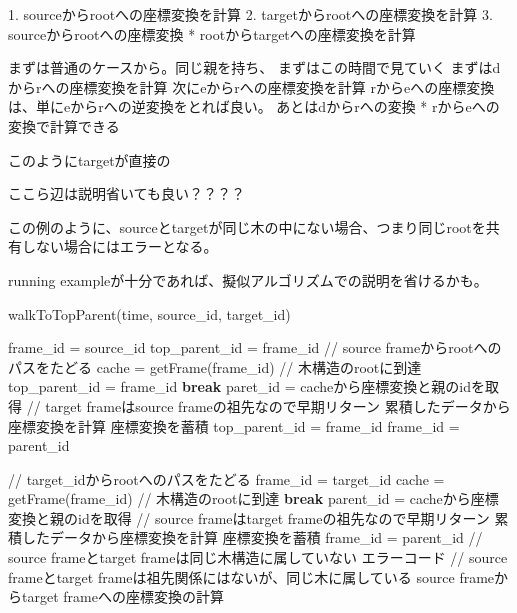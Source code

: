 \documentclass[a4paper]{jreport}	%
\begin{document}
1. sourceからrootへの座標変換を計算
2. targetからrootへの座標変換を計算
3. sourceからrootへの座標変換 * rootからtargetへの座標変換を計算

まずは普通のケースから。同じ親を持ち、
%
まずはこの時間で見ていく
まずはdからrへの座標変換を計算
次にeからrへの座標変換を計算
rからeへの座標変換は、単にeからrへの逆変換をとれば良い。
あとはdからrへの変換 * rからeへの変換で計算できる


このようにtargetが直接の

ここら辺は説明省いても良い？？？？

この例のように、sourceとtargetが同じ木の中にない場合、つまり同じrootを共有しない場合にはエラーとなる。


running exampleが十分であれば、擬似アルゴリズムでの説明を省けるかも。

\begin{algorithm}[H]
	\caption{walkToTopParent(time, source\_id, target\_id)}
	\begin{algorithmic}
	\STATE frame\_id = source\_id
	\STATE top\_parent\_id = frame\_id
	\STATE // source frameからrootへのパスをたどる
	\STATE cache = getFrame(frame\_id)
	\STATE // 木構造のrootに到達
	\STATE top\_parent\_id = frame\_id
	\STATE \textbf{break}
	\ENDIF
	\STATE paret\_id = cacheから座標変換と親のidを取得
	\STATE // target frameはsource frameの祖先なので早期リターン
	\STATE 累積したデータから座標変換を計算
	\ENDIF
	\STATE 座標変換を蓄積
	\STATE top\_parent\_id = frame\_id
	\STATE frame\_id = parent\_id
	\ENDWHILE
	
	\STATE // target\_idからrootへのパスをたどる
	\STATE frame\_id = target\_id
	\STATE cache = getFrame(frame\_id)
	\STATE // 木構造のrootに到達
	\STATE \textbf{break}
	\ENDIF
	\STATE parent\_id = cacheから座標変換と親のidを取得
	\STATE // source frameはtarget frameの祖先なので早期リターン
	\STATE 累積したデータから座標変換を計算
	\ENDIF
	\STATE 座標変換を蓄積
	\STATE frame\_id = parent\_id
	\ENDWHILE
	\STATE // source frameとtarget frameは同じ木構造に属していない
	\RETURN エラーコード
	\ENDIF
	\STATE // source frameとtarget frameは祖先関係にはないが、同じ木に属している
	\STATE source frameからtarget frameへの座標変換の計算
	\end{algorithmic}
\end{algorithm}
\end{document}
